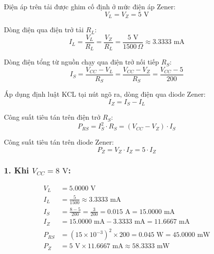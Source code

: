 \noindent Điện áp trên tải được ghim cố định ở mức điện áp Zener:
\begin{equation}
  V_L = V_Z = 5\text{ V}
\end{equation}

\noindent Dòng điện qua điện trở tải $R_L$:
\begin{equation}
  I_L = \frac{V_L}{R_L} = \frac{V_Z}{R_L} = \frac{5\text{ V}}{1500\,\Omega} \approx 3.3333\text{ mA}
\end{equation}

\noindent Dòng điện tổng từ nguồn chạy qua điện trở nối tiếp $R_S$:
\begin{equation}
  I_S = \frac{V_{CC} - V_L}{R_S} = \frac{V_{CC} - V_Z}{R_S} = \frac{V_{CC} - 5}{200}
\end{equation}

\noindent Áp dụng định luật KCL tại nút ngõ ra, dòng điện qua diode Zener:
\begin{equation}
  I_Z = I_S - I_L
\end{equation}

\noindent Công suất tiêu tán trên điện trở $R_S$:
\begin{equation}
  P_{RS} = I_S^2 \cdot R_S = (V_{CC} - V_Z) \cdot I_S
\end{equation}

\noindent Công suất tiêu tán trên diode Zener:
\begin{equation}
  P_Z = V_Z \cdot I_Z = 5 \cdot I_Z
\end{equation}

\subsubsection*{1. Khi $V_{CC} = 8\text{ V}$:}
\begin{align*}
  V_L &= 5.0000\text{ V} \\
  I_L &= \frac{5}{1500} \approx 3.3333\text{ mA} \\
  I_S &= \frac{8 - 5}{200} = \frac{3}{200} = 0.015\text{ A} = 15.0000\text{ mA} \\
  I_Z &= 15.0000\text{ mA} - 3.3333\text{ mA} = 11.6667\text{ mA} \\
  P_{RS} &= (15 \times 10^{-3})^2 \times 200 = 0.045\text{ W} = 45.0000\text{ mW} \\
  P_Z &= 5\text{ V} \times 11.6667\text{ mA} \approx 58.3333\text{ mW}
\end{align*}

